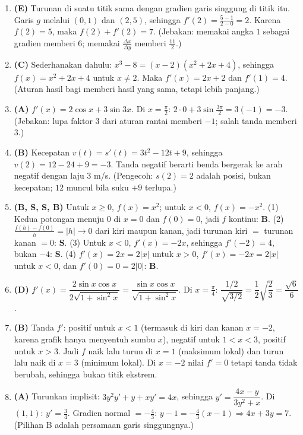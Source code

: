 \documentclass[a4paper,11pt]{article}
\newcounter{no}
\begin{document}
\small\begin{enumerate}[leftmargin=2em,itemsep=2pt,topsep=2pt]
\item[\textbf{1.}] \textbf{(E)} Turunan di suatu titik sama dengan gradien garis singgung di titik itu. Garis $g$ melalui $(0,1)$ dan $(2,5)$, sehingga $f'(2)=\frac{5-1}{2-0}=2$. Karena $f(2)=5$, maka $f(2)+f'(2)=7$. (Jebakan: memakai angka $1$ sebagai gradien memberi $6$; memakai $\frac{\Delta x}{\Delta y}$ memberi $\frac{11}2$.)
\item[\textbf{2.}] \textbf{(C)} Sederhanakan dahulu: $x^3-8=(x-2)(x^2+2x+4)$, sehingga $f(x)=x^2+2x+4$ untuk $x\neq2$. Maka $f'(x)=2x+2$ dan $f'(1)=4$. (Aturan hasil bagi memberi hasil yang sama, tetapi lebih panjang.)
\item[\textbf{3.}] \textbf{(A)} $f'(x)=2\cos x+3\sin3x$. Di $x=\frac\pi2$: $2\cdot0+3\sin\frac{3\pi}2=3(-1)=-3$. (Jebakan: lupa faktor $3$ dari aturan rantai memberi $-1$; salah tanda memberi $3$.)
\item[\textbf{4.}] \textbf{(B)} Kecepatan $v(t)=s'(t)=3t^2-12t+9$, sehingga $v(2)=12-24+9=-3$. Tanda negatif berarti benda bergerak ke arah negatif dengan laju $3$ m/s. (Pengecoh: $s(2)=2$ adalah posisi, bukan kecepatan; $12$ muncul bila suku $+9$ terlupa.)
\item[\textbf{5.}] \textbf{(B, S, S, B)} Untuk $x\ge0$, $f(x)=x^2$; untuk $x<0$, $f(x)=-x^2$. (1) Kedua potongan menuju $0$ di $x=0$ dan $f(0)=0$, jadi $f$ kontinu: \textbf{B}. (2) $\frac{f(h)-f(0)}h=|h|\to0$ dari kiri maupun kanan, jadi turunan kiri $=$ turunan kanan $=0$: \textbf{S}. (3) Untuk $x<0$, $f'(x)=-2x$, sehingga $f'(-2)=4$, bukan $-4$: \textbf{S}. (4) $f'(x)=2x=2|x|$ untuk $x>0$, $f'(x)=-2x=2|x|$ untuk $x<0$, dan $f'(0)=0=2|0|$: \textbf{B}.
\item[\textbf{6.}] \textbf{(D)} $f'(x)=\dfrac{2\sin x\cos x}{2\sqrt{1+\sin^2x}}=\dfrac{\sin x\cos x}{\sqrt{1+\sin^2x}}$. Di $x=\frac\pi4$: $\dfrac{1/2}{\sqrt{3/2}}=\dfrac12\sqrt{\dfrac23}=\dfrac{\sqrt6}{6}$.
\item[\textbf{7.}] \textbf{(B)} Tanda $f'$: positif untuk $x<1$ (termasuk di kiri dan kanan $x=-2$, karena grafik hanya menyentuh sumbu $x$), negatif untuk $1<x<3$, positif untuk $x>3$. Jadi $f$ naik lalu turun di $x=1$ (maksimum lokal) dan turun lalu naik di $x=3$ (minimum lokal). Di $x=-2$ nilai $f'=0$ tetapi tanda tidak berubah, sehingga bukan titik ekstrem.
\item[\textbf{8.}] \textbf{(A)} Turunkan implisit: $3y^2y'+y+xy'=4x$, sehingga $y'=\dfrac{4x-y}{3y^2+x}$. Di $(1,1)$: $y'=\frac34$. Gradien normal $=-\frac43$: $y-1=-\frac43(x-1)\Rightarrow 4x+3y=7$. (Pilihan B adalah persamaan garis singgungnya.)

\end{enumerate}
\end{document}
